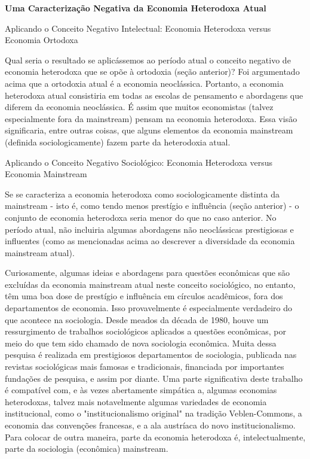 \documentclass[12pt]{article}
\begin{document}
\textbf{Uma Caracterização Negativa da Economia Heterodoxa Atual}

Aplicando o Conceito Negativo Intelectual: Economia Heterodoxa versus Economia Ortodoxa

Qual seria o resultado se aplicássemos ao período atual o conceito negativo de economia heterodoxa que se opõe à ortodoxia (seção anterior)? Foi argumentado acima que a ortodoxia atual é a economia neoclássica. Portanto, a economia heterodoxa atual consistiria em todas as escolas de pensamento e abordagens que diferem da economia neoclássica. É assim que muitos economistas (talvez especialmente fora da mainstream) pensam na economia heterodoxa. Essa visão significaria, entre outras coisas, que alguns elementos da economia mainstream (definida sociologicamente) fazem parte da heterodoxia atual.

Aplicando o Conceito Negativo Sociológico: Economia Heterodoxa versus Economia Mainstream

Se se caracteriza a economia heterodoxa como sociologicamente distinta da mainstream - isto é, como tendo menos prestígio e influência (seção anterior) - o conjunto de economia heterodoxa seria menor do que no caso anterior. No período atual, não incluiria algumas abordagens não neoclássicas prestigiosas e influentes (como as mencionadas acima ao descrever a diversidade da economia mainstream atual).

Curiosamente, algumas ideias e abordagens para questões econômicas que são excluídas da economia mainstream atual neste conceito sociológico, no entanto, têm uma boa dose de prestígio e influência em círculos acadêmicos, fora dos departamentos de economia. Isso provavelmente é especialmente verdadeiro do que acontece na sociologia. Desde meados da década de 1980, houve um ressurgimento de trabalhos sociológicos aplicados a questões econômicas, por meio do que tem sido chamado de nova sociologia econômica. Muita dessa pesquisa é realizada em prestigiosos departamentos de sociologia, publicada nas revistas sociológicas mais famosas e tradicionais, financiada por importantes fundações de pesquisa, e assim por diante. Uma parte significativa deste trabalho é compatível com, e às vezes abertamente simpática a, algumas economias heterodoxas, talvez mais notavelmente algumas variedades de economia institucional, como o "institucionalismo original" na tradição Veblen-Commons, a economia das convenções francesas, e a ala austríaca do novo institucionalismo. Para colocar de outra maneira, parte da economia heterodoxa é, intelectualmente, parte da sociologia (econômica) mainstream.
\end{document}

